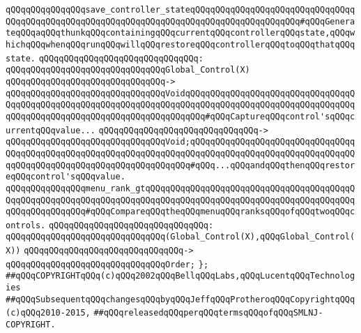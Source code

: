 \newline
\newline
\verb|qQQqqQQqqQQqqQQqsave_controller_stateqQQqqQQqqQQqqQQqqQQqqQQqqQQqqQQqqQQqqQQqqQQqqQQqqQQqqQQqqQQqqQQqqQQqqQQqqQQqqQQqqQQqqQQqqQQq#qQQqGenerateqQQqaqQQqthunkqQQqcontainingqQQqcurrentqQQqcontrollerqQQqstate,qQQqwhichqQQqwhenqQQqrunqQQqwillqQQqrestoreqQQqcontrollerqQQqtoqQQqthatqQQqstate.|\newline
\verb|qQQqqQQqqQQqqQQqqQQqqQQqqQQqqQQq:|\newline
\verb|qQQqqQQqqQQqqQQqqQQqqQQqqQQqqQQqGlobal_Control(X)|\newline
\verb|qQQqqQQqqQQqqQQqqQQqqQQqqQQqqQQq->|\newline
\verb|qQQqqQQqqQQqqQQqqQQqqQQqqQQqqQQqVoidqQQqqQQqqQQqqQQqqQQqqQQqqQQqqQQqqQQqqQQqqQQqqQQqqQQqqQQqqQQqqQQqqQQqqQQqqQQqqQQqqQQqqQQqqQQqqQQqqQQqqQQqqQQqqQQqqQQqqQQqqQQqqQQqqQQqqQQqqQQqqQQq#qQQqCaptureqQQqcontrol'sqQQqcurrentqQQqvalue...|\newline
\verb|qQQqqQQqqQQqqQQqqQQqqQQqqQQqqQQq->|\newline
\verb|qQQqqQQqqQQqqQQqqQQqqQQqqQQqqQQqVoid;qQQqqQQqqQQqqQQqqQQqqQQqqQQqqQQqqQQqqQQqqQQqqQQqqQQqqQQqqQQqqQQqqQQqqQQqqQQqqQQqqQQqqQQqqQQqqQQqqQQqqQQqqQQqqQQqqQQqqQQqqQQqqQQqqQQqqQQqqQQq#qQQq...qQQqandqQQqthenqQQqrestoreqQQqcontrol'sqQQqvalue.|\newline
\newline
\newline
\verb|qQQqqQQqqQQqqQQqmenu_rank_gtqQQqqQQqqQQqqQQqqQQqqQQqqQQqqQQqqQQqqQQqqQQqqQQqqQQqqQQqqQQqqQQqqQQqqQQqqQQqqQQqqQQqqQQqqQQqqQQqqQQqqQQqqQQqqQQqqQQqqQQqqQQqqQQq#qQQqCompareqQQqtheqQQqmenuqQQqranksqQQqofqQQqtwoqQQqcontrols.|\newline
\verb|qQQqqQQqqQQqqQQqqQQqqQQqqQQqqQQq:|\newline
\verb|qQQqqQQqqQQqqQQqqQQqqQQqqQQqqQQq(Global_Control(X),qQQqGlobal_Control(X))|\newline
\verb|qQQqqQQqqQQqqQQqqQQqqQQqqQQqqQQq->|\newline
\verb|qQQqqQQqqQQqqQQqqQQqqQQqqQQqqQQqOrder;|\newline
\newline
\verb|};|\newline
\newline
\newline
\verb|##qQQqCOPYRIGHTqQQq(c)qQQq2002qQQqBellqQQqLabs,qQQqLucentqQQqTechnologies|\newline
\verb|##qQQqSubsequentqQQqchangesqQQqbyqQQqJeffqQQqProtheroqQQqCopyrightqQQq(c)qQQq2010-2015,|\newline
\verb|##qQQqreleasedqQQqperqQQqtermsqQQqofqQQqSMLNJ-COPYRIGHT.|\newline


